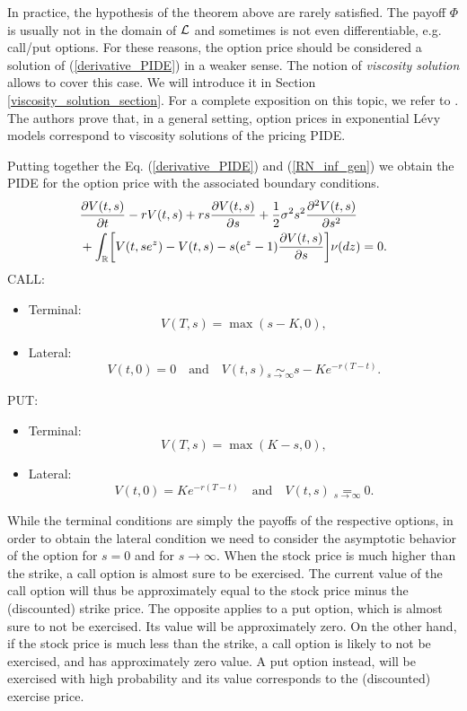 In practice, the hypothesis of the theorem above are rarely satisfied. 
The payoff $\Phi$ is usually not in the domain of $\mathcal{L}$ and sometimes is not even differentiable, e.g. call/put options.   
For these reasons, the option price should be considered a solution of (\ref{derivative_PIDE}) in a weaker sense. 
The notion of \emph{viscosity solution} allows to cover this case.
We will introduce it in Section \ref{viscosity_solution_section}. 
For a complete exposition on this topic, we refer to \cite{CoVo05}.  The authors prove that, in a general setting,
option prices in exponential Lévy models correspond to viscosity solutions of the pricing PIDE.

Putting together the Eq. (\ref{derivative_PIDE}) and (\ref{RN_inf_gen}) we obtain the PIDE for the option price with the associated boundary conditions.
\begin{align}\label{PIDE_option}
&  \frac{\partial V(t,s)}{\partial t} - r V(t,s) + r s \frac{\partial V(t,s)}{\partial s}
+ \frac{1}{2} \sigma^2 s^2 \frac{\partial^2  V(t,s)}{\partial s^2}  \\ \nonumber
&+ \int_{\mathbb{R}} \biggl[ V(t,se^z) - V(t,s) - s(e^z-1)\frac{\partial V(t,s)}{\partial s} \biggr] \nu(dz) = 0.
\end{align}
CALL:
\begin{itemize}
 \item Terminal:
 $$ V(T,s) = \max(s-K,0), $$
 \item Lateral:
 $$ V(t,0) = 0 \quad \mbox{and} \quad V(t, s) \underset{s \to \infty}{\sim} s - Ke^{-r(T-t)}. $$
\end{itemize}
PUT:
\begin{itemize}
 \item Terminal:
 $$ V(T,s) = \max(K-s,0), $$
 \item Lateral:
 $$ V(t,0) = Ke^{-r(T-t)} \quad \mbox{and} \quad V(t, s) \underset{s \to \infty}{=} 0. $$
\end{itemize}
While the terminal conditions are simply the payoffs of the respective options, in order to obtain the lateral condition we need to consider the asymptotic behavior
of the option for $s=0$ and for $s\to \infty$.
When the stock price is much higher than the strike, a call option is almost sure to be exercised. 
The current value of the call option will thus be approximately equal to the stock price minus the (discounted) strike price. 
The opposite applies to a put option, which is almost sure to not be exercised. Its value will be approximately zero.
On the other hand, if the stock price is much less than the strike, a call option is likely to not be exercised, and has approximately zero value.
A put option instead, will be exercised with high probability and its value corresponds to the (discounted) exercise price.


